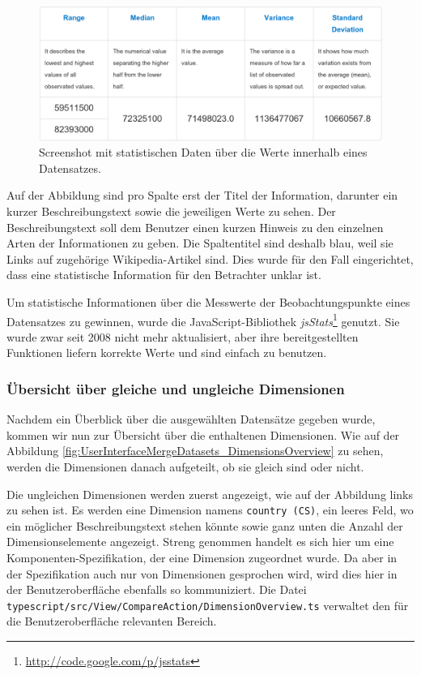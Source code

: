 \documentclass[11pt]{article}
\newcommand{\com}[1]{\marginpar{\em {\small{#1}}}} %
\begin{document}
%
%
\begin{figure}[h!]
    \centering
    \includegraphics[width=15cm]{UserInterfaceMergeDatasets/StatisticsAboutMeasureValues.pdf}
    \caption{Screenshot mit statistischen Daten über die Werte innerhalb eines Datensatzes.}
    \label{fig:UserInterfaceMergeDatasets_StatisticsAboutMeasureValues}
\end{figure}

\noindent
Auf der Abbildung sind pro Spalte erst der Titel der Information, darunter ein kurzer Beschreibungstext sowie die jeweiligen Werte zu sehen. Der Beschreibungstext soll dem Benutzer einen kurzen Hinweis zu den einzelnen Arten der Informationen zu geben. Die Spaltentitel sind deshalb blau, weil sie Links auf zugehörige Wikipedia-Artikel sind. Dies wurde für den Fall eingerichtet, dass eine statistische Information für den Betrachter unklar ist.

Um statistische Informationen über die Messwerte der Beobachtungspunkte eines Datensatzes zu gewinnen, wurde die JavaScript-Bibliothek \textit{jsStats}\footnote{\url{http://code.google.com/p/jsstats}}\com{jsStats} genutzt. Sie wurde zwar seit 2008 nicht mehr aktualisiert, aber ihre bereitgestellten Funktionen liefern korrekte Werte und sind einfach zu benutzen.

%
%
\subsubsection{Übersicht über gleiche und ungleiche Dimensionen}

Nachdem ein Überblick über die ausgewählten Datensätze gegeben wurde, kommen wir nun zur Übersicht über die enthaltenen Dimensionen. Wie auf der Abbildung \ref{fig:UserInterfaceMergeDatasets_DimensionsOverview} zu sehen,\com{Anforderung \\ F-330, S. \pageref{req:F330}} werden die Dimensionen danach aufgeteilt, ob sie gleich sind oder nicht.

Die ungleichen Dimensionen werden zuerst angezeigt, wie auf der Abbildung links zu sehen ist. Es werden eine Dimension namens \verb|country (CS)|, ein leeres Feld, wo ein möglicher Beschreibungstext stehen könnte sowie ganz unten die Anzahl der Dimensionselemente angezeigt. Streng genommen handelt es sich hier um eine Komponenten-Spezifikation, der eine Dimension zugeordnet wurde. Da aber in der Spezifikation auch nur von Dimensionen gesprochen wird, wird dies hier in der Benutzeroberfläche ebenfalls so kommuniziert. Die Datei \verb|typescript/src/View/CompareAction/DimensionOverview.ts| verwaltet den für die Benutzeroberfläche relevanten Bereich.
\end{document}
